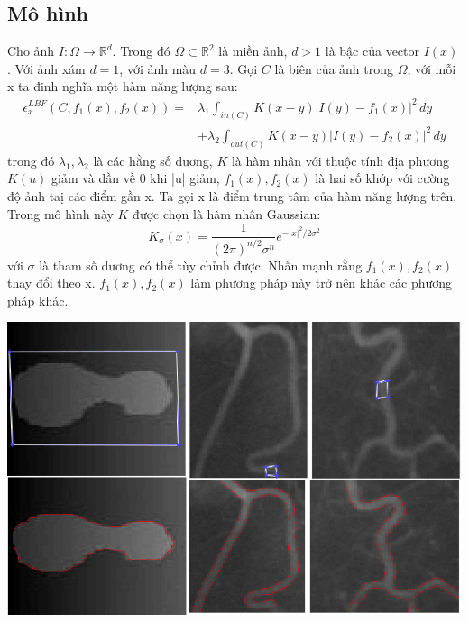 \documentclass[12pt, oneside, a4paper]{book}
\begin{document}
\subsection{Mô hình}
\hspace{0.5cm}Cho ảnh $I: \Omega \rightarrow \mathbb{R}^d$. Trong đó $\Omega \subset \mathbb{R}^2$  là miền ảnh, $d>1$ là bậc của vector $I(x)$. Với ảnh xám $d=1$, với ảnh màu $d=3$. Gọi $C$ là biên của ảnh trong $\Omega$, với mỗi x ta đinh nghĩa một hàm năng lượng sau:
\begin{equation}
\begin{split}
\epsilon_x^{LBF}(C, f_1(x), f_2(x))=&\lambda_1 \int_{in(C)} K(x-y)|I(y)-f_1(x)|^2\,dy\\
									&+ \lambda_2 \int_{out(C)} K(x-y)|I(y)-f_2(x)|^2\,dy 
\end{split}
\end{equation}
trong đó $\lambda_1, \lambda_2$ là các hằng số dương, $K$ là hàm nhân với thuộc tính địa phương $K(u)$ giảm và dần về 0 khi |u| giảm, $f_1(x), f_2(x)$ là hai số khớp với cường độ ảnh taị các điểm gần x. Ta gọi x là điểm trung tâm của hàm năng lượng trên. Trong mô hình này $K$ được chọn là hàm nhân Gaussian:
\begin{equation*}
K_{\sigma}(x)=\dfrac{1}{(2\pi)^{n/2}\sigma^n}e^{-|x|^2/2\sigma^2}
\end{equation*}
với $\sigma$ là tham số dương có thể tùy chỉnh được. Nhấn mạnh rằng $f_1(x), f_2(x)$ thay đổi theo x. $f_1(x), f_2(x)$ làm phương pháp này trở nên khác các phương pháp khác.
\begin{center}
\includegraphics[scale=0.7]{figure/LBFresult.png}
\end{center}
\end{document}
